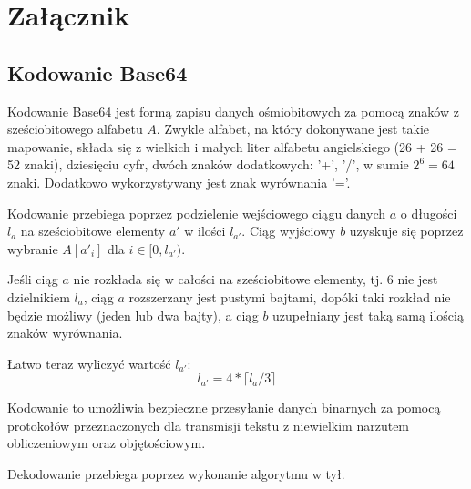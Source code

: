 \chapter{Załącznik}

\section{Kodowanie Base64}\label{sec:base64}

Kodowanie Base64 jest formą zapisu danych ośmiobitowych za pomocą znaków z sześciobitowego alfabetu $A$. Zwykle alfabet, na który dokonywane jest takie mapowanie, składa się z wielkich i małych liter alfabetu angielskiego (26 + 26 = 52 znaki), dziesięciu cyfr, dwóch znaków dodatkowych: '+', '/', w sumie $2^6 = 64$ znaki. Dodatkowo wykorzystywany jest znak wyrównania '='.

Kodowanie przebiega poprzez podzielenie wejściowego ciągu danych $a$ o długości $l_a$ na sześciobitowe elementy $a'$ w ilości $l_{a'}$. Ciąg wyjściowy $b$ uzyskuje się poprzez wybranie $A[a'_i]$ dla $i \in [0, l_{a'})$.

Jeśli ciąg $a$ nie rozkłada się w całości na sześciobitowe elementy, tj. 6 nie jest dzielnikiem $l_a$, ciąg $a$ rozszerzany jest pustymi bajtami, dopóki taki rozkład nie będzie możliwy (jeden lub dwa bajty), a ciąg $b$ uzupełniany jest taką samą ilością znaków wyrównania.

Łatwo teraz wyliczyć wartość $l_{a'}$:
\begin{equation}
 l_{a'} = 4 * \lceil l_a / 3 \rceil
\end{equation}

Kodowanie to umożliwia bezpieczne przesyłanie danych binarnych za pomocą protokołów przeznaczonych dla transmisji tekstu z niewielkim narzutem obliczeniowym oraz objętościowym.

Dekodowanie przebiega poprzez wykonanie algorytmu w tył.
